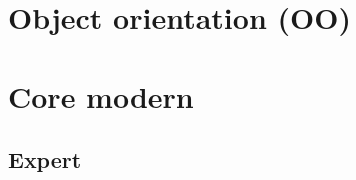 \documentclass[compress]{beamer}
\begin{document}
\section[OO]{Object orientation (OO)}






\begin{advanced}
  
\end{advanced}


\begin{advanced}
  
\end{advanced}

\section[Core]{Core modern \cpp}

\begin{advanced}
  
\end{advanced}

\begin{advanced}
  
  
\end{advanced}



\begin{advanced}
  
  
  
\end{advanced}

\begin{advanced}
  
\end{advanced}

\begin{advanced}
  \section[exp]{Expert \cpp}
  
  
  
  
  
  
  
\end{advanced}
\end{document}
